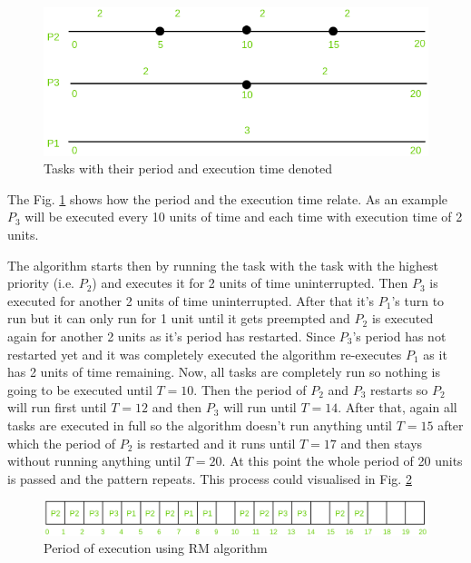 \documentclass[conference]{IEEEtran}
\begin{document}
\begin{figure}[h]
    \centering
    \includegraphics[scale=0.3]{RM overview.png}
    \caption{Tasks with their period and execution time denoted}
    \label{fig:RMoverview}
\end{figure}
The Fig. \ref{fig:RMoverview} shows how the period and the execution time relate. As an example $P_3$ will be executed every 10 units of time and each time with execution time of 2 units.

The algorithm starts then by running the task with the task with the highest priority (i.e. $P_2$) and executes it for 2 units of time uninterrupted. Then $P_3$ is executed for another 2 units of time uninterrupted. After that it's $P_1$'s turn to run but it can only run for 1 unit until it gets preempted and $P_2$ is executed again for another 2 units as it's period has restarted. Since $P_3$'s period has not restarted yet and it was completely executed the algorithm re-executes $P_1$ as it has 2 units of time remaining. Now, all tasks are completely run so nothing is going to be executed until $T=10$. Then the period of $P_2$ and $P_3$ restarts so $P_2$ will run first until $T=12$ and then $P_3$ will run until $T=14$. After that, again all tasks are executed in full so the algorithm doesn't run anything until $T=15$ after which the period of $P_2$ is restarted and it runs until $T=17$ and then stays without running anything until $T=20$. At this point the whole period of 20 units is passed and the pattern repeats. This process could visualised in Fig. \ref{fig:rmTimetable}
\begin{figure}
    \centering
    \includegraphics[scale=0.1]{rmtimetable.png}
    \caption{Period of execution using RM algorithm}
    \label{fig:rmTimetable}
\end{figure}
\end{document}
